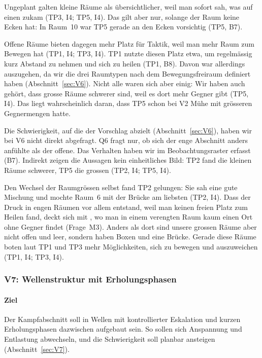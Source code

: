 \documentclass[../Main.tex]{subfiles}
\begin{document}
Ungeplant galten kleine Räume als übersichtlicher, weil man sofort sah, was auf einen zukam (TP3, I4; TP5, I4). Das gilt aber nur, solange der Raum keine Ecken hat: In Raum~10 war TP5 gerade an den Ecken vorsichtig (TP5, B7).

Offene Räume bieten dagegen mehr Platz für Taktik, weil man mehr Raum zum Bewegen hat (TP1, I4; TP3, I4). TP1 nutzte diesen Platz etwa, um regelmässig kurz Abstand zu nehmen und sich zu heilen (TP1, B8). Davon war allerdings auszugehen, da wir die drei Raumtypen nach dem Bewegungsfreiraum definiert haben (Abschnitt~\ref{sec:V6}). Nicht alle waren sich aber einig: Wir haben auch gehört, dass grosse Räume schwerer sind, weil es dort mehr Gegner gibt (TP5, I4). Das liegt wahrscheinlich daran, dass TP5 schon bei V2 Mühe mit grösseren Gegnermengen hatte.

Die Schwierigkeit, auf die der Vorschlag abzielt (Abschnitt~\ref{sec:V6}), haben wir bei V6 nicht direkt abgefragt. Q6 fragt nur, ob sich der enge Abschnitt anders anfühlte als der offene. Das Verhalten haben wir im Beobachtungsraster erfasst (B7). Indirekt zeigen die Aussagen kein einheitliches Bild: TP2 fand die kleinen Räume schwerer, TP5 die grossen (TP2, I4; TP5, I4).

Den Wechsel der Raumgrössen selbst fand TP2 gelungen: Sie sah eine gute Mischung und mochte Raum~6 mit der Brücke am liebsten (TP2, I4). Dass der Druck in engen Räumen vor allem entstand, weil man keinen freien Platz zum Heilen fand, deckt sich mit , wo man in einem verengten Raum kaum einen Ort ohne Gegner findet (Frage~M3). Anders als dort sind unsere grossen Räume aber nicht offen und leer, sondern haben Boxen und eine Brücke.  Gerade diese Räume boten laut TP1 und TP3 mehr Möglichkeiten, sich zu bewegen und auszuweichen (TP1, I4; TP3, I4).


\subsubsection{V7: Wellenstruktur mit Erholungsphasen}

\paragraph{Ziel}
Der Kampfabschnitt soll in Wellen mit kontrollierter Eskalation und kurzen Erholungsphasen dazwischen aufgebaut sein. So sollen sich Anspannung und Entlastung abwechseln, und die Schwierigkeit soll planbar ansteigen (Abschnitt~\ref{sec:V7}).
\end{document}
